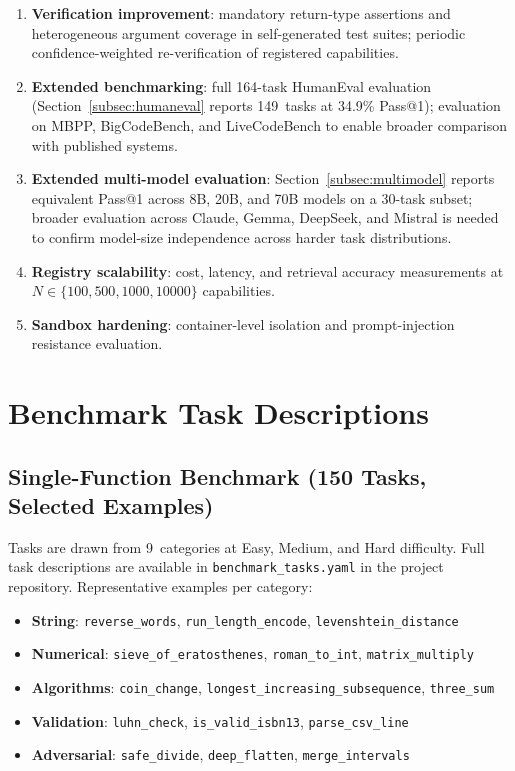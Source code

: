 \documentclass[conference]{IEEEtran}
\begin{document}
\begin{enumerate}
  \item \textbf{Verification improvement}: mandatory return-type assertions
        and heterogeneous argument coverage in self-generated test suites;
        periodic confidence-weighted re-verification of registered
        capabilities.
  \item \textbf{Extended benchmarking}: full 164-task HumanEval evaluation
        (Section~\ref{subsec:humaneval} reports 149~tasks at 34.9\%
        Pass@1); evaluation on MBPP, BigCodeBench, and LiveCodeBench to
        enable broader comparison with published systems.
  \item \textbf{Extended multi-model evaluation}: Section~\ref{subsec:multimodel}
        reports equivalent Pass@1 across 8B, 20B, and 70B models on a
        30-task subset; broader evaluation across Claude, Gemma, DeepSeek,
        and Mistral is needed to confirm model-size independence across
        harder task distributions.
  \item \textbf{Registry scalability}: cost, latency, and retrieval
        accuracy measurements at $N \in \{100, 500, 1000, 10000\}$
        capabilities.
  \item \textbf{Sandbox hardening}: container-level isolation and
        prompt-injection resistance evaluation.
\end{enumerate}

\appendix
\section{Benchmark Task Descriptions}
\label{appendix:tasks}

\subsection{Single-Function Benchmark (150 Tasks, Selected Examples)}

Tasks are drawn from 9~categories at Easy, Medium, and Hard difficulty.
Full task descriptions are available in \texttt{benchmark\_tasks.yaml}
in the project repository.
Representative examples per category:

\begin{itemize}
  \item \textbf{String}: \texttt{reverse\_words}, \texttt{run\_length\_encode},
        \texttt{levenshtein\_distance}
  \item \textbf{Numerical}: \texttt{sieve\_of\_eratosthenes},
        \texttt{roman\_to\_int}, \texttt{matrix\_multiply}
  \item \textbf{Algorithms}: \texttt{coin\_change},
        \texttt{longest\_increasing\_subsequence}, \texttt{three\_sum}
  \item \textbf{Validation}: \texttt{luhn\_check}, \texttt{is\_valid\_isbn13},
        \texttt{parse\_csv\_line}
  \item \textbf{Adversarial}: \texttt{safe\_divide}, \texttt{deep\_flatten},
        \texttt{merge\_intervals}
\end{itemize}
\end{document}
